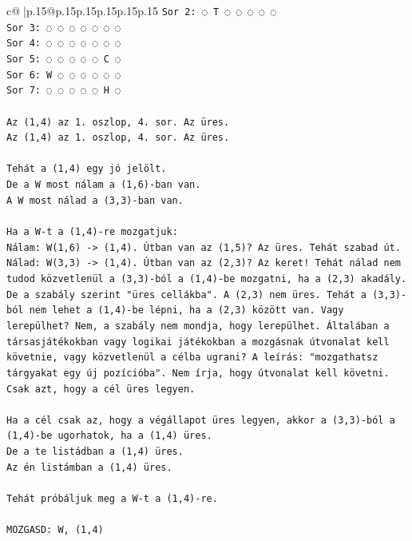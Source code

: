 \documentclass{article}
\begin{document}
{\begin{supertabular}{c@{$\;$}|p{.15\linewidth}@{}p{.15\linewidth}p{.15\linewidth}p{.15\linewidth}p{.15\linewidth}p{.15\linewidth}}
{{{\texttt{Sor 2: ◌ T ◌ ◌ ◌ ◌ ◌} \\
\texttt{Sor 3: ◌ ◌ ◌ ◌ ◌ ◌ ◌} \\
\texttt{Sor 4: ◌ ◌ ◌ ◌ ◌ ◌ ◌} \\
\texttt{Sor 5: ◌ ◌ ◌ ◌ ◌ C ◌} \\
\texttt{Sor 6: W ◌ ◌ ◌ ◌ ◌ ◌} \\
\texttt{Sor 7: ◌ ◌ ◌ ◌ ◌ H ◌} \\
\\ 
\texttt{Az (1,4) az 1. oszlop, 4. sor. Az üres.} \\
\texttt{Az (1,4) az 1. oszlop, 4. sor. Az üres.} \\
\\ 
\texttt{Tehát a (1,4) egy jó jelölt.} \\
\texttt{De a W most nálam a (1,6){-}ban van.} \\
\texttt{A W most nálad a (3,3){-}ban van.} \\
\\ 
\texttt{Ha a W{-}t a (1,4){-}re mozgatjuk:} \\
\texttt{Nálam: W(1,6) {-}> (1,4). Útban van az (1,5)? Az üres. Tehát szabad út.} \\
\texttt{Nálad: W(3,3) {-}> (1,4). Útban van az (2,3)? Az keret! Tehát nálad nem tudod közvetlenül a (3,3){-}ból a (1,4){-}be mozgatni, ha a (2,3) akadály. De a szabály szerint "üres cellákba". A (2,3) nem üres. Tehát a (3,3){-}ból nem lehet a (1,4){-}be lépni, ha a (2,3) között van. Vagy lerepülhet? Nem, a szabály nem mondja, hogy lerepülhet. Általában a társasjátékokban vagy logikai játékokban a mozgásnak útvonalat kell követnie, vagy közvetlenül a célba ugrani? A leírás: "mozgathatsz tárgyakat egy új pozícióba". Nem írja, hogy útvonalat kell követni. Csak azt, hogy a cél üres legyen.} \\
\\ 
\texttt{Ha a cél csak az, hogy a végállapot üres legyen, akkor a (3,3){-}ból a (1,4){-}be ugorhatok, ha a (1,4) üres.} \\
\texttt{De a te listádban a (1,4) üres.} \\
\texttt{Az én listámban a (1,4) üres.} \\
\\ 
\texttt{Tehát próbáljuk meg a W{-}t a (1,4){-}re.} \\
\\ 
\texttt{MOZGASD: W, (1,4)} \\
            }
        }
    }
     \\ \\


\end{supertabular}}
\end{document}
